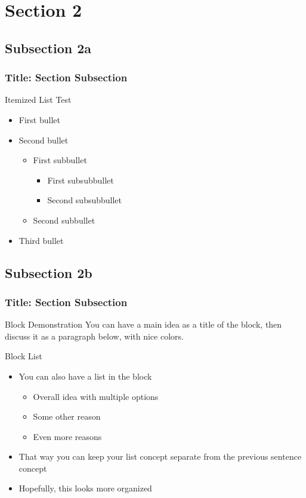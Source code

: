 \documentclass[aspectratio=169]{beamer}
\begin{document}
\section{Section 2}

\subsection{Subsection 2a}

\begin{frame}
\frametitle{Title: Section \thesection Subsection \thesubsection}
Itemized List Test
\begin{itemize}
    \item First bullet
    \item Second bullet
    \begin{itemize}
        \item First subbullet
        \begin{itemize}
            \item First subsubbullet
            \item Second subsubbullet
        \end{itemize}
        \item Second subbullet
    \end{itemize}
    \item Third bullet
\end{itemize}
\end{frame}

\subsection{Subsection 2b}

\begin{frame}
\frametitle{Title: Section \thesection Subsection \thesubsection}
\begin{block}{Block Demonstration}
You can have a main idea as a title of the block, then discuss it as a paragraph below, with nice colors.
\end{block}
\begin{block}{Block List}
    \begin{itemize}
      \item You can also have a list in the block
        \begin{itemize}
          \item Overall idea with multiple options
          \item Some other reason
          \item Even more reasons
        \end{itemize}
      \item That way you can keep your list concept separate from the previous sentence concept
      \item Hopefully, this looks more organized
    \end{itemize}
\end{block}
\end{frame}
\end{document}
